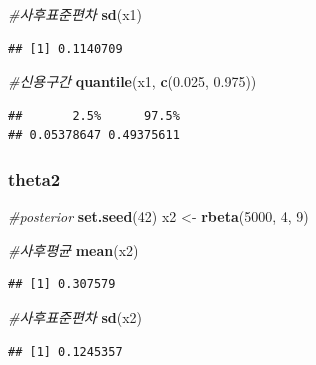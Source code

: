 \documentclass[
]{article}
\newenvironment{Shaded}{\begin{snugshade}}{\end{snugshade}}
\newcommand{\CommentTok}[1]{\textcolor[rgb]{0.56,0.35,0.01}{\textit{#1}}}
\newcommand{\DecValTok}[1]{\textcolor[rgb]{0.00,0.00,0.81}{#1}}
\newcommand{\FloatTok}[1]{\textcolor[rgb]{0.00,0.00,0.81}{#1}}
\newcommand{\FunctionTok}[1]{\textcolor[rgb]{0.13,0.29,0.53}{\textbf{#1}}}
\newcommand{\NormalTok}[1]{#1}
\newcommand{\OtherTok}[1]{\textcolor[rgb]{0.56,0.35,0.01}{#1}}
\begin{document}
\begin{Shaded}
\begin{Highlighting}[]
\CommentTok{\#사후표준편차}
\FunctionTok{sd}\NormalTok{(x1)}
\end{Highlighting}
\end{Shaded}

\begin{verbatim}
## [1] 0.1140709
\end{verbatim}

\begin{Shaded}
\begin{Highlighting}[]
\CommentTok{\#신용구간}
\FunctionTok{quantile}\NormalTok{(x1, }\FunctionTok{c}\NormalTok{(}\FloatTok{0.025}\NormalTok{, }\FloatTok{0.975}\NormalTok{))}
\end{Highlighting}
\end{Shaded}

\begin{verbatim}
##       2.5%      97.5% 
## 0.05378647 0.49375611
\end{verbatim}

\subsubsection{theta2}\label{theta2}

\begin{Shaded}
\begin{Highlighting}[]
\CommentTok{\#posterior}
\FunctionTok{set.seed}\NormalTok{(}\DecValTok{42}\NormalTok{)}
\NormalTok{x2 }\OtherTok{\textless{}{-}} \FunctionTok{rbeta}\NormalTok{(}\DecValTok{5000}\NormalTok{, }\DecValTok{4}\NormalTok{, }\DecValTok{9}\NormalTok{)}

\CommentTok{\#사후평균}
\FunctionTok{mean}\NormalTok{(x2)}
\end{Highlighting}
\end{Shaded}

\begin{verbatim}
## [1] 0.307579
\end{verbatim}

\begin{Shaded}
\begin{Highlighting}[]
\CommentTok{\#사후표준편차}
\FunctionTok{sd}\NormalTok{(x2)}
\end{Highlighting}
\end{Shaded}

\begin{verbatim}
## [1] 0.1245357
\end{verbatim}
\end{document}
